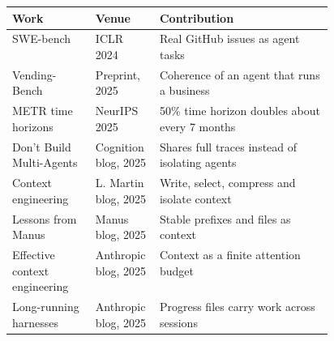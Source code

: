 \begin{center}\footnotesize
\begin{tabularx}{\linewidth}{L{0.26\linewidth}L{0.2\linewidth}X}
\toprule
\textbf{Work} & \textbf{Venue} & \textbf{Contribution} \\
\midrule
SWE-bench & ICLR 2024 & Real GitHub issues as agent tasks \\
Vending-Bench & Preprint, 2025 & Coherence of an agent that runs a business \\
METR time horizons & NeurIPS 2025 & 50\% time horizon doubles about every 7 months \\
Don't Build Multi-Agents & Cognition blog, 2025 & Shares full traces instead of isolating agents \\
Context engineering & L. Martin blog, 2025 & Write, select, compress and isolate context \\
Lessons from Manus & Manus blog, 2025 & Stable prefixes and files as context \\
Effective context engineering & Anthropic blog, 2025 & Context as a finite attention budget \\
Long-running harnesses & Anthropic blog, 2025 & Progress files carry work across sessions \\
\bottomrule
\end{tabularx}
\end{center}

